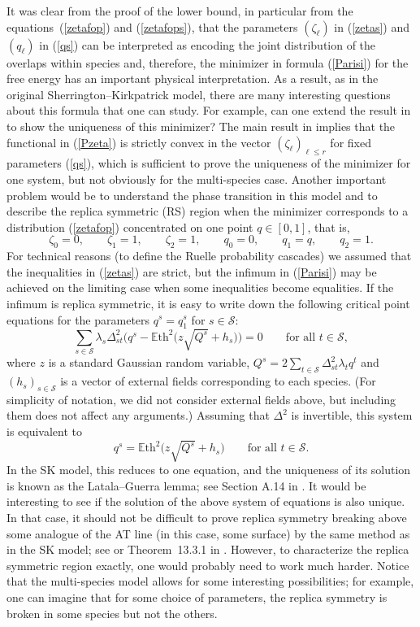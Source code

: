 \documentclass[aop,MSNbibl,dvips]{arximspdf}
\def\cal{\mathscr}
\newcommand{\spe}{{\cal S}}
\newcommand{\e}{\mathbb{E}}
\begin{document}
It was clear from the proof of the lower bound, in particular from the
equations~(\ref{zetafop}) and (\ref{zetafops}), that the parameters
$(\zeta_\ell)$ in (\ref{zetas}) and $(q_\ell)$ in (\ref{qs}) can be
interpreted as encoding the joint distribution of the overlaps within
species and, therefore, the minimizer in formula (\ref{Parisi}) for the
free energy has an important physical interpretation. As a result, as
in the original Sherrington--Kirkpatrick model, there are many
interesting questions about this formula that one can study. For
example, can one extend the result in \cite{AC} to show the uniqueness
of this minimizer? The main result in \cite{AC} implies that the
functional in (\ref{Pzeta}) is strictly convex in the vector $(\zeta
_\ell)_{\ell\leq r}$ for fixed parameters (\ref{qs}), which is
sufficient to prove the uniqueness of the minimizer for one system, but
not obviously for the multi-species case. Another important problem
would be to understand the phase transition in this model and to
describe the replica symmetric (RS) region when the minimizer
corresponds to a distribution (\ref{zetafop}) concentrated on one point
$q\in[0,1]$, that is,
%
\[
\zeta_0 = 0,\qquad \zeta_1=1,\qquad \zeta_2=1,\qquad
q_0=0, \qquad q_1 = q,\qquad q_2=1.
\]
%
For technical reasons (to define the Ruelle probability cascades) we
assumed that the inequalities in (\ref{zetas}) are strict, but the
infimum in (\ref{Parisi}) may be achieved on the limiting case when
some inequalities become equalities. If the infimum is replica
symmetric, it is easy to write down the following critical point
equations for the parameters $q^s = q_1^s$ for $s\in\spe$:
%
\[
\sum_{s\in\spe} \lambda_s
\Delta_{st}^2 \bigl( q^s - \e
\mbox{th}^2 \bigl(z \sqrt{Q^s} + h_s \bigr)
\bigr) = 0 \qquad\mbox{for all } t\in\spe,
\]
%
where $z$ is a standard Gaussian random variable, $Q^s = 2\sum_{t\in
\spe} \Delta_{st}^2 \lambda_t q^t$ and $(h_s)_{s\in\spe}$ is a vector
of external fields corresponding to each species. (For simplicity of
notation, we did not consider external fields above, but including them
does not affect any arguments.) Assuming that $\Delta^2$ is invertible,
this system is equivalent to
%
\[
q^s = \e \mbox{th}^2 \bigl(z \sqrt{Q^s} +
h_s \bigr) \qquad\mbox{for all } t\in\spe.
\]
%
In the SK model, this reduces to one equation, and the uniqueness of
its solution is known as the Latala--Guerra lemma; see Section A.14 in
\cite{SG2}. It would be interesting to see if the solution of the above
system of equations is also unique. In that case, it should not be
difficult to prove replica symmetry breaking above some analogue of the
AT line (in this case, some surface) by the same method as in the SK
model; see \cite{TAT} or Theorem~13.3.1 in \cite{SG2}. However, to
characterize the replica symmetric region exactly, one would probably
need to work much harder. Notice that the multi-species model allows
for some interesting possibilities; for example, one can imagine that
for some choice of parameters, the replica symmetry is broken in some
species but not the others.
\end{document}
